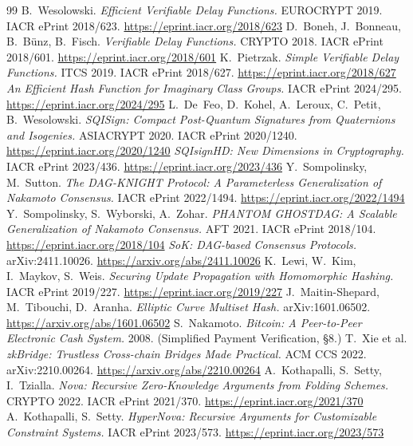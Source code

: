 \begin{thebibliography}{99}
 B.~Wesolowski. \emph{Efficient Verifiable Delay
  Functions.} EUROCRYPT 2019. IACR ePrint 2018/623.
  \url{https://eprint.iacr.org/2018/623}
 D.~Boneh, J.~Bonneau, B.~B\"unz, B.~Fisch.
  \emph{Verifiable Delay Functions.} CRYPTO 2018. IACR ePrint 2018/601.
  \url{https://eprint.iacr.org/2018/601}
 K.~Pietrzak. \emph{Simple Verifiable Delay Functions.}
  ITCS 2019. IACR ePrint 2018/627. \url{https://eprint.iacr.org/2018/627}
 \emph{An Efficient Hash Function for Imaginary
  Class Groups.} IACR ePrint 2024/295. \url{https://eprint.iacr.org/2024/295}
 L.~De~Feo, D.~Kohel, A.~Leroux, C.~Petit, B.~Wesolowski.
  \emph{SQISign: Compact Post-Quantum Signatures from Quaternions and
  Isogenies.} ASIACRYPT 2020. IACR ePrint 2020/1240.
  \url{https://eprint.iacr.org/2020/1240}
 \emph{SQIsignHD: New Dimensions in Cryptography.}
  IACR ePrint 2023/436. \url{https://eprint.iacr.org/2023/436}
 Y.~Sompolinsky, M.~Sutton. \emph{The DAG-KNIGHT
  Protocol: A Parameterless Generalization of Nakamoto Consensus.}
  IACR ePrint 2022/1494. \url{https://eprint.iacr.org/2022/1494}
 Y.~Sompolinsky, S.~Wyborski, A.~Zohar.
  \emph{PHANTOM GHOSTDAG: A Scalable Generalization of Nakamoto Consensus.}
  AFT 2021. IACR ePrint 2018/104. \url{https://eprint.iacr.org/2018/104}
 \emph{SoK: DAG-based Consensus Protocols.}
  arXiv:2411.10026. \url{https://arxiv.org/abs/2411.10026}
 K.~Lewi, W.~Kim, I.~Maykov, S.~Weis. \emph{Securing Update
  Propagation with Homomorphic Hashing.} IACR ePrint 2019/227.
  \url{https://eprint.iacr.org/2019/227}
 J.~Maitin-Shepard, M.~Tibouchi, D.~Aranha. \emph{Elliptic
  Curve Multiset Hash.} arXiv:1601.06502. \url{https://arxiv.org/abs/1601.06502}
 S.~Nakamoto. \emph{Bitcoin: A Peer-to-Peer Electronic
  Cash System.} 2008. (Simplified Payment Verification, \S 8.)
 T.~Xie et al. \emph{zkBridge: Trustless Cross-chain
  Bridges Made Practical.} ACM CCS 2022. arXiv:2210.00264.
  \url{https://arxiv.org/abs/2210.00264}
 A.~Kothapalli, S.~Setty, I.~Tzialla. \emph{Nova: Recursive
  Zero-Knowledge Arguments from Folding Schemes.} CRYPTO 2022. IACR ePrint
  2021/370. \url{https://eprint.iacr.org/2021/370}
 A.~Kothapalli, S.~Setty. \emph{HyperNova: Recursive
  Arguments for Customizable Constraint Systems.} IACR ePrint 2023/573.
  \url{https://eprint.iacr.org/2023/573}
\end{thebibliography}
